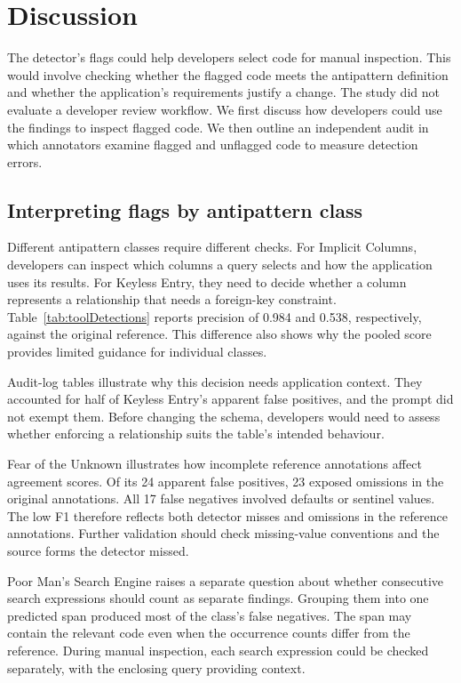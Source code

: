\section{Discussion}\label{sec:discussion}

The detector's flags could help developers select code for manual inspection. This would involve checking whether the flagged code meets the antipattern definition and whether the application's requirements justify a change. The study did not evaluate a developer review workflow. We first discuss how developers could use the findings to inspect flagged code. We then outline an independent audit in which annotators examine flagged and unflagged code to measure detection errors.

\subsection{Interpreting flags by antipattern class}

Different antipattern classes require different checks. For Implicit Columns, developers can inspect which columns a query selects and how the application uses its results. For Keyless Entry, they need to decide whether a column represents a relationship that needs a foreign-key constraint. Table~\ref{tab:toolDetections} reports precision of \num{0.984} and \num{0.538}, respectively, against the original reference. This difference also shows why the pooled score provides limited guidance for individual classes.

Audit-log tables illustrate why this decision needs application context. They accounted for half of Keyless Entry's apparent false positives, and the prompt did not exempt them. Before changing the schema, developers would need to assess whether enforcing a relationship suits the table's intended behaviour.

Fear of the Unknown illustrates how incomplete reference annotations affect agreement scores. Of its \num{24} apparent false positives, \num{23} exposed omissions in the original annotations. All \num{17} false negatives involved defaults or sentinel values. The low F1 therefore reflects both detector misses and omissions in the reference annotations. Further validation should check missing-value conventions and the source forms the detector missed.

Poor Man's Search Engine raises a separate question about whether consecutive search expressions should count as separate findings. Grouping them into one predicted span produced most of the class's false negatives. The span may contain the relevant code even when the occurrence counts differ from the reference. During manual inspection, each search expression could be checked separately, with the enclosing query providing context.

